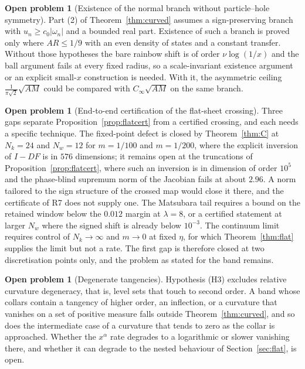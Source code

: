 \documentclass[11pt]{article}
\newcommand{\Cinf}{C_\infty}
\theoremstyle{definition}
\newtheorem{problem}[theorem]{Open problem}
\theoremstyle{remark}
\begin{document}
\begin{problem}[Existence of the normal branch without particle--hole symmetry]\label{prob:asymmetry}
Part (2) of Theorem~\ref{thm:curved} assumes a sign-preserving branch with $u_n\ge c_0|\omega_n|$ and a bounded real part. Existence of such a branch is proved only where $AR\le1/9$ with an even density of states and a constant transfer. Without those hypotheses the bare rainbow shift is of order $\nu\log(1/x)$ and the ball argument fails at every fixed radius, so a scale-invariant existence argument or an explicit small-$x$ construction is needed. With it, the asymmetric ceiling $\frac{1}{\pi\sqrt2}\sqrt{AM}$ could be compared with $\Cinf\sqrt{AM}$ on the same branch.
\end{problem}

\begin{problem}[End-to-end certification of the flat-sheet crossing]\label{prob:flatcert}
Three gaps separate Proposition~\ref{prop:flatcert} from a certified crossing, and each needs a specific technique. The fixed-point defect is closed by Theorem~\ref{thm:C} at $N_k=24$ and $N_w=12$ for $m=1/100$ and $m=1/200$, where the explicit inversion of $I-DF$ is in $576$ dimensions; it remains open at the truncations of Proposition~\ref{prop:flatcert}, where such an inversion is in dimension of order $10^5$ and the phase-blind supremum norm of the Jacobian fails at about $2.96$. A norm tailored to the sign structure of the crossed map would close it there, and the certificate of R7 does not supply one. The Matsubara tail requires a bound on the retained window below the $0.012$ margin at $\lambda=8$, or a certified statement at larger $N_w$ where the signed shift is already below $10^{-3}$. The continuum limit requires control of $N_k\to\infty$ and $m\to0$ at fixed $\eta$, for which Theorem~\ref{thm:flat} supplies the limit but not a rate. The first gap is therefore closed at two discretisation points only, and the problem as stated for the band remains.
\end{problem}

\begin{problem}[Degenerate tangencies]\label{prob:tangency}
Hypothesis (H3) excludes relative curvature degeneracy, that is, level sets that touch to second order. A band whose collars contain a tangency of higher order, an inflection, or a curvature that vanishes on a set of positive measure falls outside Theorem~\ref{thm:curved}, and so does the intermediate case of a curvature that tends to zero as the collar is approached. Whether the $x^\alpha$ rate degrades to a logarithmic or slower vanishing there, and whether it can degrade to the nested behaviour of Section~\ref{sec:flat}, is open.
\end{problem}
\end{document}

